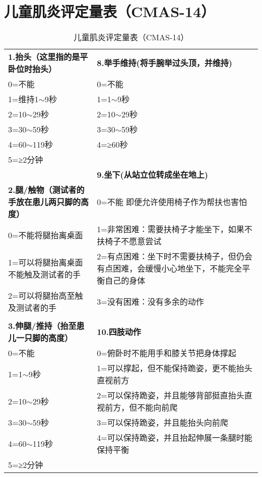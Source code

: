 \newpage
\appendix
\renewcommand{\tablename}{附表}

\section{儿童肌炎评定量表（CMAS-14）} \label{appendix_cmas}

\begin{table}[h]
\tiny
\centering
\caption{儿童肌炎评定量表（CMAS-14）}
\label{cmas_14}
\begin{tabular}{|p{}||p{}|}
\hline
\textbf{1.抬头（这里指的是平卧位时抬头）} & \textbf{8.举手维持(将手腕举过头顶，并维持)}\\ \cline{1-2}
0=不能 & 0=不能  \\
1=维持1$\sim$9秒  & 1=1$\sim$9秒\\
2=10$\sim$29秒  & 2=10$\sim$29秒  \\
3=30$\sim$59秒  & 3=30$\sim$59秒  \\
4=60$\sim$119秒 & 4=≥60秒\\
5=≥2分钟    &       \\ \cline{2-2}
      & \cellcolor{LightCyan} \textbf{9.坐下(从站立位转成坐在地上)}   \\ \cline{1-2}
\textbf{2.腿/触物（测试者的手放在患儿两只脚的高度）}               & 0=不能   即便允许使用椅子作为帮扶也害怕     \\ \cline{1-1}
0=不能将腿抬离桌面 & 1=非常困难：需要扶椅子才能坐下，如果不扶椅子不愿意尝试 \\
1=可以将腿抬离桌面不能触及测试者的手 & 2=有点困难：坐下时不需要扶椅子，但仍会有点困难，会缓慢小心地坐下，不能完全平衡自己的身体 \\
2=可以将腿抬高至触及测试者的手 & 3=没有困难：没有多余的动作             \\
      &       \\ \cline{1-2}
\textbf{3.伸腿/推持（抬至患儿一只脚的高度）}  & \textbf{10.四肢动作}   \\ \cline{1-2}
0=不能  & 0=俯卧时不能用手和膝关节把身体撑起         \\
1=1$\sim$9秒& 1=可以撑起，但不能保持跪姿，更不能抬头直视前方   \\
2=10$\sim$29秒  & 2=可以保持跪姿，并且能够背部挺直抬头直视前方，但不能向前爬 \\
3=30$\sim$59秒  & 3=可以保持跪姿，并且能抬头向前爬          \\
4=60$\sim$119秒 & 4=可以保持跪姿，并且抬起伸展一条腿时能保持平衡   \\
5=≥2分钟&       \\ \cline{2-2}

\end{tabular}
\end{table}

